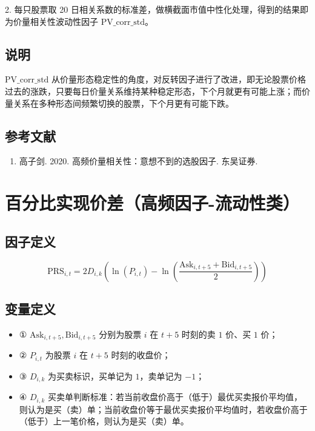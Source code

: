 \documentclass{article}
\begin{document}
2. 每只股票取 20 日相关系数的标准差，做横截面市值中性化处理，得到的结果即为价量相关性波动性因子 \( \mathrm{PV\_corr\_std} \)。

\subsection{说明}
\( \mathrm{PV\_corr\_std} \) 从价量形态稳定性的角度，对反转因子进行了改进，即无论股票价格过去的涨跌，只要每日价量关系维持某种稳定形态，下个月就更有可能上涨；而价量关系在多种形态间频繁切换的股票，下个月更有可能下跌。

\subsection{参考文献}
\begin{enumerate}
    \item 高子剑. 2020. 高频价量相关性：意想不到的选股因子. 东吴证券.
\end{enumerate}

\section{百分比实现价差（高频因子-流动性类）}

\subsection{因子定义}
\begin{equation}
    \mathrm{PRS}_{i,t} = 2D_{i,k} \left( \ln(P_{i,t}) - \ln\left(\frac{\mathrm{Ask}_{i,t+5} + \mathrm{Bid}_{i,t+5}}{2}\right) \right)
\end{equation}

\subsection{变量定义}
\begin{itemize}
    \item ① \( \mathrm{Ask}_{i,t+5}, \mathrm{Bid}_{i,t+5} \) 分别为股票 \( i \) 在 \( t+5 \) 时刻的卖 \( 1 \) 价、买 \( 1 \) 价；
    \item ② \( P_{i,t} \) 为股票 \( i \) 在 \( t+5 \) 时刻的收盘价；
    \item ③ \( D_{i,k} \) 为买卖标识，买单记为 \( 1 \)，卖单记为 \( -1 \)；
    \item ④ \( D_{i,k} \) 买卖单判断标准：若当前收盘价高于（低于）最优买卖报价平均值，则认为是买（卖）单；当前收盘价等于最优买卖报价平均值时，若收盘价高于（低于）上一笔价格，则认为是买（卖）单。
\end{itemize}
\end{document}
